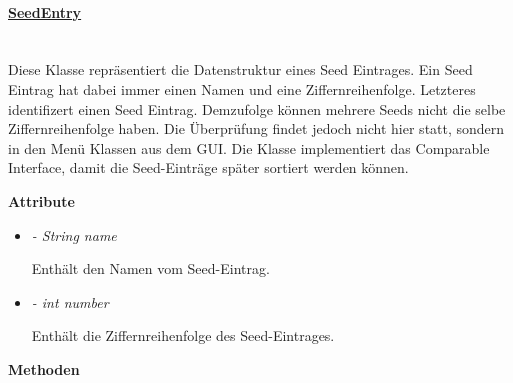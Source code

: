     \paragraph{\underline{SeedEntry}}\label{seedentry} \mbox{}\\
        Diese Klasse repräsentiert die Datenstruktur eines Seed Eintrages.
        Ein Seed Eintrag hat dabei immer einen Namen und eine Ziffernreihenfolge.
        Letzteres identifizert einen Seed Eintrag. Demzufolge können
        mehrere Seeds nicht die selbe Ziffernreihenfolge haben. Die Überprüfung
        findet jedoch nicht hier statt, sondern in den Menü Klassen aus dem GUI.
        Die Klasse implementiert das Comparable Interface, damit die Seed-Einträge
        später sortiert werden können.\\
        \par
        \pagebreak
        \textbf{Attribute}
        \begin{itemize}
            \item \textit{- String name}  
                \begin{leftbar}[0.9\linewidth]
                    Enthält den Namen vom Seed-Eintrag.
                \end{leftbar}
            \item \textit{- int number} 
                \begin{leftbar}[0.9\linewidth]
                    Enthält die Ziffernreihenfolge des Seed-Eintrages.
                \end{leftbar}
        \end{itemize}
        \textbf{Methoden}					
